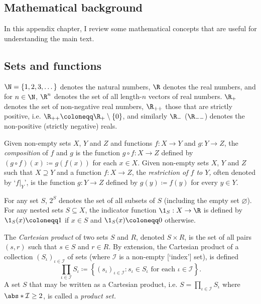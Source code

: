 \documentclass[11pt,letterpaper,reqno,oneside]{book}
\begin{document}
\begin{appendices}





\chapter{Mathematical background}
\label{math}

In this appendix chapter, I review some mathematical concepts that are useful for understanding the main text.



\section{Sets and functions}
\label{math:set}

$\N = \{1,2,3,\dots\}$ denotes the natural numbers, $\R$ denotes the real numbers, and for $n \in \N$, $\R^n$ denotes the set of all length-$n$ vectors of real numbers. $\R_+$ denotes the set of non-negative real numbers, $\R_{++}$ those that are strictly positive, i.e. $\R_{++} \coloneqq \R_+ \setminus \{0\}$, and similarly $\R_-$ ($\R_{--}$) denotes the non-positive (strictly negative) reals.

Given non-empty sets $X$, $Y$ and $Z$ and functions $f : X \to Y$ and $g : Y \to Z$, the \emph{composition} of $f$ and $g$ is the function $g \circ f : X \to Z$ defined by $(g \circ f)(x) \coloneqq g(f(x))$ for each $x \in X$. Given non-empty sets $X$, $Y$ and $Z$ such that $X \supseteq Y$ and a function $f : X \to Z$, the \emph{restriction of $f$ to $Y$,} often denoted by `$f|_Y$', is the function $g : Y \to Z$ defined by $g(y) \coloneqq f(y)$ for every $y \in Y$.

For any set $S$, $2^S$ denotes the set of all subsets of $S$ (including the empty set $\varnothing$). For any nested sets $S \subseteq X$, the indicator function $\1_S : X \to \R$ is defined by $\1_S(x) \coloneqq 1$ if $x \in S$ and $\1_S(x) \coloneqq 0$ otherwise.

The \emph{Cartesian product} of two sets $S$ and $R$, denoted $S \times R$, is the set of all pairs $(s,r)$ such that $s \in S$ and $r \in R$. By extension, the Cartesian product of a collection $(S_\iota)_{\iota \in \mathcal{I}}$ of sets (where $\mathcal{I}$ is a non-empty [`index'] set), is defined
%
\begin{equation*}
	\prod_{\iota \in \mathcal{I}} S_\iota
	\coloneqq \left\{
	(s_\iota)_{\iota \in \mathcal{I}} : 
	\text{$s_\iota \in S_\iota$ for each $\iota \in \mathcal{I}$}
	\right\} .
\end{equation*}
%
A set $S$ that may be written as a Cartesian product, i.e. $S = \prod_{\iota \in \mathcal{I}} S_\iota$ where $\abs*{\mathcal{I}} \geq 2$, is called a \emph{product set.}


\end{appendices}
\end{document}
